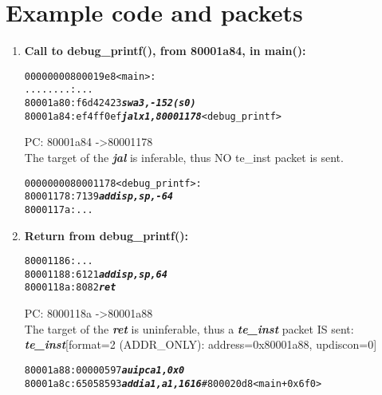 \chapter{Example code and packets}

\begin{enumerate}
\item
  \textbf{Call to debug\_printf(), from 80001a84, in main():}
  \begin {alltt}
00000000800019e8 <main>:
    ........:	...
    80001a80:	f6d42423          	 \textbf{\textit{sw	a3,-152(s0)}}
    80001a84:	ef4ff0ef          	 \textbf{\textit{jal	x1,80001178}} <debug\_printf>
  \end{alltt}

  \begin{frame}

    PC: 80001a84 -\textgreater 80001178 \\
    The target of the \textbf{\textit{jal}} is inferable, thus NO te\_inst packet is sent.\\
  \end{frame}
\begin {alltt}

0000000080001178 <debug\_printf>:
    80001178:	7139                	\textbf{\textit{addi	sp,sp,-64}}
    8000117a:	...
  \end{alltt}

\item
  \textbf{Return from debug\_printf():}
  \begin{alltt}
    80001186:	...
    80001188:	6121                	\textbf{\textit{addi	sp,sp,64}}
    8000118a:	8082                	\textbf{\textit{ret}}
  \end{alltt}

  \begin{frame}

    PC: 8000118a -\textgreater 80001a88 \\
    The target of the  \textbf{\textit{ret}} is uninferable, thus a \textbf{\textit{te\_inst}} packet IS sent:\\
    \textbf{\textit{te\_inst}}[format=2 (ADDR\_ONLY): address=0x80001a88, updiscon=0]
  \end{frame}

  \begin{alltt}
    80001a88:	00000597          	\textbf{\textit{auipc	a1,0x0}}
    80001a8c:	65058593          	\textbf{\textit{addi	a1,a1,1616}} # 800020d8 <main+0x6f0>
  \end{alltt}



\end{enumerate}
